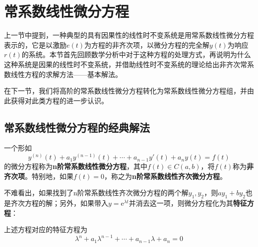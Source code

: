 \section{常系数线性微分方程}\label{sec:ODE}

上一节中提到，一种典型的具有因果性的线性时不变系统是用常系数线性微分方程表示的，它是以激励$e(t)$为方程的非齐次项，以微分方程的完全解$y(t)$为响应$r(t)$的系统。本节首先回顾数学分析中对于这种方程的处理方式，再说明为什么这种系统是因果的线性时不变系统，并借助线性时不变系统的理论给出非齐次常系数线性方程的求解方法——基本解法。

在下一节，我们将高阶的常系数线性微分方程转化为常系数线性微分方程组，并由此获得对此类方程的进一步认识。

\subsection{常系数线性微分方程的经典解法}\label{sub:solution_of_ODE}

\begin{definition}[常系数线性微分方程]
    一个形如
    \[y^{(n)}(t)+a_{1}y^{(n-1)}(t)+\cdots +a_{n-1} y'(t)+a_n y(t)=f(t)\]
    的微分方程称为\textbf{n阶常系数线性微分方程}，其中$f(t)\in C(a,b)$，将$f(t)$称为\textbf{非齐次项}。特别地，如果$f(t)=0$，称之为\textbf{n阶常系数线性齐次微分方程}。
\end{definition}

不难看出，如果找到了n阶常系数线性齐次微分方程的两个解$y_1,y_2$，则$ay_1+by_2$也是齐次方程的解；另外，如果带入$y=\mathrm{e}^{\lambda t}$并消去这一项，则微分方程化为其\textbf{特征方程}：
\begin{definition}[特征方程]
    上述方程对应的特征方程为
    \[\lambda^n+a_{1}\lambda^{n-1}+\cdots+a_{n-1}\lambda+a_n=0\]
\end{definition}

